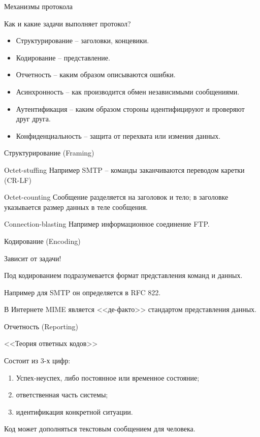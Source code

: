 \begin{frame}{Механизмы протокола}

	\begin{block}{Как и какие задачи выполняет протокол?}
	\begin{itemize}
		\item Структурирование -- заголовки,  концевики.
			\pause
		\item Кодирование -- представление.
			\pause
		\item Отчетность -- каким образом описываются ошибки.
			\pause
		\item Асинхронность -- как производится обмен независимыми сообщениями.
			\pause
		\item Аутентификация -- каким образом стороны идентифицируют и проверяют друг друга.
			\pause
		\item Конфиденциальность -- защита от перехвата или измения данных.
	\end{itemize}
	\end{block}
\end{frame}


\begin{frame}{Структурирование (Framing)}

	\begin{block}{Octet-stuffing}
Например SMTP -- команды заканчиваются переводом каретки (CR-LF)
	\end{block}
	\pause
	\begin{block}{Octet-counting}
Сообщение разделяется на заголовок и тело; в заголовке указывается размер данных в теле сообщения.
	\end{block}
	\pause
	\begin{block}{Connection-blasting}
Например информационное соединение FTP.
	\end{block}

\end{frame}
\begin{frame}{Кодирование (Encoding)}

	\large{Зависит от задачи!}

	Под кодированием подразумевается формат представления команд и данных.

	Например для SMTP он определяется в RFC 822.

	В Интернете MIME является <<де-факто>> стандартом представления данных.
\end{frame}

\begin{frame}{Отчетность (Reporting)}

	\begin{block}{<<Теория ответных кодов>>}

	Состоит из 3-х цифр:
	\begin{enumerate}
		\item Успех-неуспех,  либо постоянное или временное состояние; 
		\item ответственная часть системы;
		\item идентификация конкретной ситуации.
	\end{enumerate}
	\end{block}

	Код может дополняться текстовым сообщением для человека.
\end{frame}

